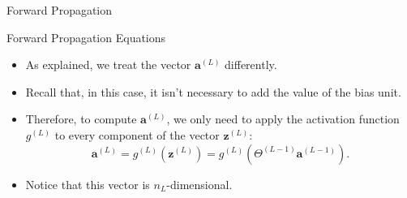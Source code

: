 \documentclass[8pt,american]{beamer}
\begin{document}
\begin{frame}{Forward Propagation}

\begin{block}{Forward Propagation Equations}
\begin{itemize}
\justifying
\item As explained, we treat the vector $\mathbf{a}^{\left(L\right)}$
  differently.
\item Recall that, in this case, it isn't necessary to add the value of the
  bias unit.
\item Therefore, to compute $\mathbf{a}^{\left(L\right)}$, we only need to
  apply the activation function $g^{\left(L\right)}$ to every component of the
  vector $\mathbf{z}^{\left(L\right)}$:
  \begin{equation}
  \mathbf{a}^{\left(L\right)}=g^{\left(L\right)}\left(\mathbf{z}^{\left(L\right)}\right)=g^{\left(L\right)}\left(\Theta^{\left(L-1\right)}\mathbf{a}^{\left(L-1\right)}\right).
  \end{equation}
\item Notice that this vector is $n_{L}$-dimensional.
\end{itemize}
\end{block}

\end{frame}
\end{document}
